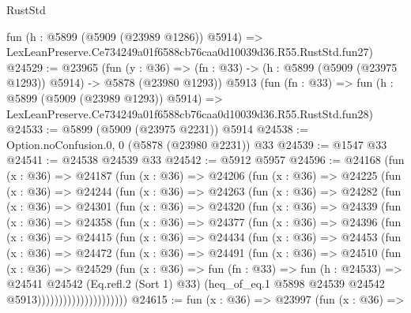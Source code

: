 \begin{lexlean}{RustStd}
\begin{coremodule}
{{    fun (h : @5899 (@5909 (@23989 @1286)) @5914) =>
    LexLeanPreserve.Ce734249a01f6588cb76caa0d10039d36.R55.RustStd.fun27)
@24529 := @23965
    (fun (y : @36) =>
    (fn : @33) -> (h : @5899 (@5909 (@23975 @1293)) @5914) -> @5878 (@23980 @1293))
    @5913
    (fun (fn : @33) =>
    fun (h : @5899 (@5909 (@23989 @1293)) @5914) =>
    LexLeanPreserve.Ce734249a01f6588cb76caa0d10039d36.R55.RustStd.fun28)
@24533 := @5899 (@5909 (@23975 @2231)) @5914
@24538 := Option.noConfusion.{0, 0} (@5878 (@23980 @2231)) @33
@24539 := @1547 @33
@24541 := @24538 @24539 @33
@24542 := @5912 @5957
@24596 := @24168
    (fun (x : @36) =>
    @24187
      (fun (x : @36) =>
      @24206
        (fun (x : @36) =>
        @24225
          (fun (x : @36) =>
          @24244
            (fun (x : @36) =>
            @24263
              (fun (x : @36) =>
              @24282
                (fun (x : @36) =>
                @24301
                  (fun (x : @36) =>
                  @24320
                    (fun (x : @36) =>
                    @24339
                      (fun (x : @36) =>
                      @24358
                        (fun (x : @36) =>
                        @24377
                          (fun (x : @36) =>
                          @24396
                            (fun (x : @36) =>
                            @24415
                              (fun (x : @36) =>
                              @24434
                                (fun (x : @36) =>
                                @24453
                                  (fun (x : @36) =>
                                  @24472
                                    (fun (x : @36) =>
                                    @24491
                                      (fun (x : @36) =>
                                      @24510
                                        (fun (x : @36) =>
                                        @24529
                                          (fun (x : @36) =>
                                          fun (fn : @33) =>
                                          fun (h : @24533) =>
                                          @24541
                                            @24542
                                            (Eq.refl.{2} (Sort 1) @33)
                                            (heq_of_eq.{1}
                                              @5898
                                              @24539
                                              @24542
                                              @5913)))))))))))))))))))))
@24615 := fun (x : @36) =>
  @23997
    (fun (x : @36) =>
}}
\end{coremodule}
\end{lexlean}
